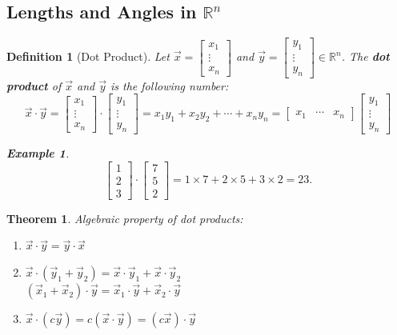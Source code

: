 \documentclass[12pt, a4paper]{article}
\newtheorem{thm}{Theorem}[subsection]
\newtheorem{df}{Definition}[subsection]
\newtheorem{eg}{Example}[subsection]
\def\R{{\mathbb{R}}}
\def\vecx{\vec{x}}
\def\vecy{\vec{y}}
\begin{document}
\subsection{Lengths and Angles in $\R^n$}
\begin{df}[Dot Product]
	Let $\vecx=\begin{bmatrix}x_1\\\vdots\\x_n\end{bmatrix}$ and $\vecy=\begin{bmatrix}y_1\\\vdots\\y_n\end{bmatrix}\in\R^n$. The \textbf{dot product} of $\vecx$ and $\vecy$ is the following number: \[\vecx\cdot\vecy=\begin{bmatrix}x_1\\\vdots\\x_n\end{bmatrix}\cdot\begin{bmatrix}y_1\\\vdots\\y_n\end{bmatrix}=x_1y_1+x_2y_2+\cdots+x_ny_n=\begin{bmatrix}x_1&\cdots&x_n\end{bmatrix}\begin{bmatrix}y_1\\\vdots\\y_n\end{bmatrix}\]	
	\begin{eg}
		\[\begin{bmatrix}1\\2\\3\end{bmatrix}\cdot\begin{bmatrix}7\\5\\2\end{bmatrix}=1\times7+2\times5+3\times2=23.\]	
	\end{eg}
\end{df}
\begin{thm}
	Algebraic property of dot products:
	\begin{enumerate}
		\item $\vecx\cdot\vecy=\vecy\cdot\vecx$
		\item $\vecx\cdot(\vecy_1+\vecy_2)=\vecx\cdot\vecy_1+\vecx\cdot\vecy_2$\\
			$(\vecx_1+\vecx_2)\cdot\vecy=\vecx_1\cdot\vecy+\vecx_2\cdot\vecy$
		\item $\vecx\cdot(c\vecy)=c(\vecx\cdot\vecy)=(c\vecx)\cdot\vecy$
	\end{enumerate}
\end{thm}
\end{document}
